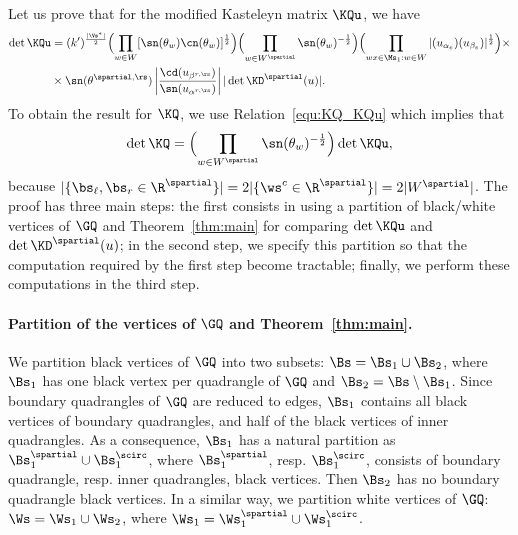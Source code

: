 \documentclass[a4paper,twoside,11pt]{article}
\begin{document}
Let us prove that for the modified Kasteleyn matrix $\KQu$, we have
\begin{align*}
\det\KQu&=(k')^{\frac{|\Vs^*|}{2}}\Bigl(\prod_{w\in W}[\sn(\theta_w)\cn(\theta_w)]^{\frac{1}{2}} \Bigr)
\Bigl(\prod_{w\in W^\spartial}\sn(\theta_w)^{-\frac{1}{2}}\Bigr) 
\Bigl(\prod_{wx\in\Ms_1:w\in W}|\sc(u_{\alpha_e})\sc(u_{\beta_e})|^{\frac{1}{2}}\Bigr)\times \\
&\times \sn(\theta^{\spartial,\rs})\left|\frac{\cd(u_{\beta^{r,\rs}})}{\sn(u_{\alpha^{r,\rs}})}\right|
|\det \KD^\spartial(u)|.
\end{align*}
To obtain the result for $\KQ$, we use Relation~\eqref{equ:KQ_KQu}
which implies that 
\[
\det\KQ = \Bigl(\prod_{w\in W^\spartial}\sn(\theta_w)^{-\frac{1}{2}}\Bigr)\det \KQu,
\]
because $|\{\bs_\ell,\bs_r\in \R^\spartial\}|=2|\{\ws^c\in\R^\spartial\}|=2|W^\spartial|$.
The proof has three main steps: the first
consists in using a partition of black/white vertices of $\GQ$ and Theorem~\ref{thm:main}
for comparing $\det\KQu$ and $\det\KD^\spartial(u)$; in the second step, we specify this partition so
that the computation required by the first step become tractable; finally, we perform these computations in the third step.

\paragraph{Partition of the vertices of $\GQ$ and Theorem~\ref{thm:main}.} We partition black vertices of $\GQ$ into two subsets: 
$\Bs=\Bs_1\cup \Bs_2$, where $\Bs_1$ has one black vertex per quadrangle of $\GQ$ and $\Bs_2=\Bs\setminus \Bs_1$.
Since boundary quadrangles of $\GQ$ are reduced to edges, $\Bs_1$ contains 
all black vertices of boundary quadrangles, and half of the black vertices of inner quadrangles. As a consequence, $\Bs_1$ has a 
natural partition as $\Bs_1^\spartial\cup \Bs_1^\scirc$, where $\Bs_1^\spartial$, resp. $\Bs_1^\scirc$, consists of boundary quadrangle, resp. inner quadrangles,
black vertices. Then $\Bs_2$ has no boundary quadrangle black vertices. 
In a similar way, we partition white vertices of $\GQ$: $\Ws=\Ws_1\cup \Ws_2$,
where $\Ws_1=\Ws_1^\spartial\cup \Ws_1^\scirc$.
\end{document}
